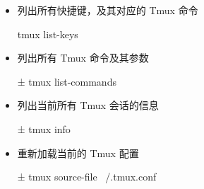 \begin{itemize}
\item 列出所有快捷键，及其对应的 Tmux 命令
\begin{commandbox}
 tmux list-keys
\end{commandbox}

\item 列出所有 Tmux 命令及其参数
\begin{commandbox}
± tmux list-commands
\end{commandbox}

\item 列出当前所有 Tmux 会话的信息
\begin{commandbox}
± tmux info
\end{commandbox}

\item 重新加载当前的 Tmux 配置
\begin{commandbox}
± tmux source-file ~/.tmux.conf
\end{commandbox}

\end{itemize}

